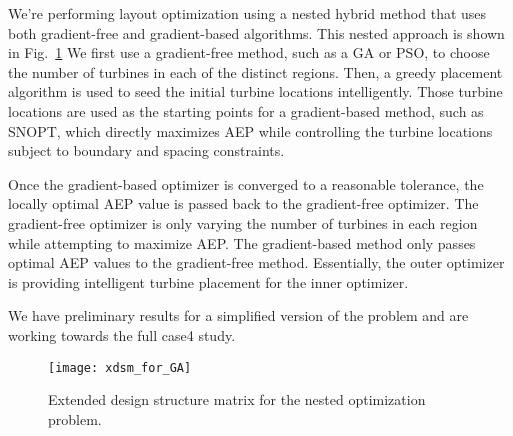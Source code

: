 \documentclass{article}
\begin{document}
We're performing layout optimization using a nested hybrid method that uses both gradient-free and gradient-based algorithms.
This nested approach is shown in Fig.~\ref{xdsm_for_GA}
We first use a gradient-free method, such as a GA or PSO, to choose the number of turbines in each of the distinct regions.
Then, a greedy placement algorithm is used to seed the initial turbine locations intelligently.
Those turbine locations are used as the starting points for a gradient-based method, such as SNOPT, which directly maximizes AEP while controlling the turbine locations subject to boundary and spacing constraints.

Once the gradient-based optimizer is converged to a reasonable tolerance, the locally optimal AEP value is passed back to the gradient-free optimizer.
The gradient-free optimizer is only varying the number of turbines in each region while attempting to maximize AEP.
The gradient-based method only passes optimal AEP values to the gradient-free method.
Essentially, the outer optimizer is providing intelligent turbine placement for the inner optimizer.

We have preliminary results for a simplified version of the problem and are working towards the full case4 study.

\begin{figure}[H]
\begin{center}
 \texttt{[image: xdsm\_for\_GA]}
 \caption{Extended design structure matrix for the nested optimization problem.}
 \label{xdsm_for_GA}
\end{center}
\end{figure}
\end{document}
